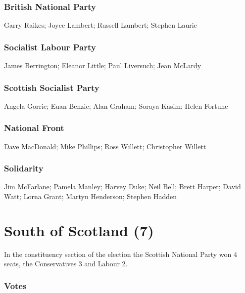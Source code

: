 \begin{resultsiii}
\subsubsection*{British National Party}
Garry Raikes; Joyce Lambert; Russell Lambert; Stephen Laurie
\subsubsection*{Socialist Labour Party}
James Berrington; Eleanor Little; Paul Liversuch; Jean McLardy
\subsubsection*{Scottish Socialist Party}
Angela Gorrie; Euan Benzie; Alan Graham; Soraya Kasim; Helen Fortune
\subsubsection*{National Front}
Dave MacDonald; Mike Phillips; Ross Willett; Christopher Willett
\subsubsection*{Solidarity}
Jim McFarlane; Pamela Manley; Harvey Duke; Neil Bell; Brett Harper; David Watt; Lorna Grant; Martyn Henderson; Stephen Hadden
\end{resultsiii}

\vfill

\section[South of Scotland]{South of Scotland (7)}

In the constituency section of the election the Scottish National Party won 4 seats, the Conservatives 3 and Labour 2.

\vfill

\subsubsection*{Votes}

